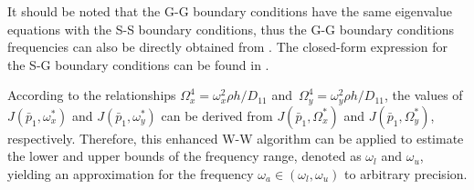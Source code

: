 \documentclass[preprint,12pt,number]{elsarticle}
\begin{document}
It should be noted that the G-G boundary conditions have the same eigenvalue equations with the S-S boundary conditions, thus the G-G boundary conditions frequencies can also be directly obtained from .
The closed-form expression for the S-G boundary conditions can be found in .

According to the relationships 
$\Omega^4_x = {{\omega_x^2 \rho h}/{D_{11}}}$ and\ $\Omega^4_y = {{\omega_y^2 \rho h}/{D_{11}}}$, 
the values of $J(\bar{p}_1, \omega_x^*)$ and $J(\bar{p}_1, \omega_y^*)$ can be derived from $J(\bar{p}_1, \Omega_x^*)$ and $J(\bar{p}_1, \Omega_y^*)$, respectively. 
Therefore, this enhanced W-W algorithm can be applied to estimate the lower and upper bounds of the frequency range, denoted as $\omega_l$ and $\omega_u$, yielding an approximation for the frequency $\omega_a \in (\omega_l, \omega_u)$ to arbitrary precision.
\end{document}
